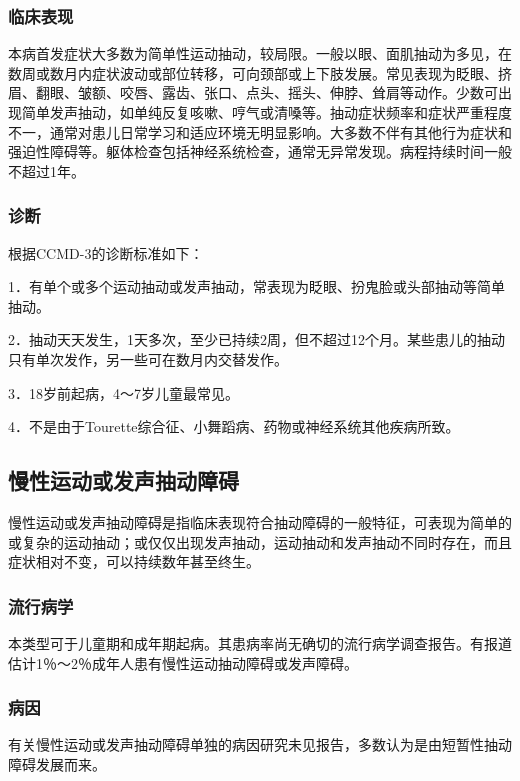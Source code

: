 \subsubsection{临床表现}

本病首发症状大多数为简单性运动抽动，较局限。一般以眼、面肌抽动为多见，在数周或数月内症状波动或部位转移，可向颈部或上下肢发展。常见表现为眨眼、挤眉、翻眼、皱额、咬唇、露齿、张口、点头、摇头、伸脖、耸肩等动作。少数可出现简单发声抽动，如单纯反复咳嗽、哼气或清嗓等。抽动症状频率和症状严重程度不一，通常对患儿日常学习和适应环境无明显影响。大多数不伴有其他行为症状和强迫性障碍等。躯体检查包括神经系统检查，通常无异常发现。病程持续时间一般不超过1年。

\subsubsection{诊断}

根据CCMD-3的诊断标准如下：

1．有单个或多个运动抽动或发声抽动，常表现为眨眼、扮鬼脸或头部抽动等简单抽动。

2．抽动天天发生，1天多次，至少已持续2周，但不超过12个月。某些患儿的抽动只有单次发作，另一些可在数月内交替发作。

3．18岁前起病，4～7岁儿童最常见。

4．不是由于Tourette综合征、小舞蹈病、药物或神经系统其他疾病所致。

\subsection{慢性运动或发声抽动障碍}

慢性运动或发声抽动障碍是指临床表现符合抽动障碍的一般特征，可表现为简单的或复杂的运动抽动；或仅仅出现发声抽动，运动抽动和发声抽动不同时存在，而且症状相对不变，可以持续数年甚至终生。

\subsubsection{流行病学}

本类型可于儿童期和成年期起病。其患病率尚无确切的流行病学调查报告。有报道估计1％～2％成年人患有慢性运动抽动障碍或发声障碍。

\subsubsection{病因}

有关慢性运动或发声抽动障碍单独的病因研究未见报告，多数认为是由短暂性抽动障碍发展而来。

